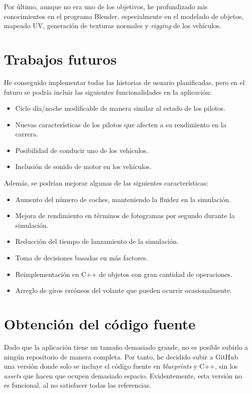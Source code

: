 \bigskip

Por último, aunque no era uno de los objetivos, he profundizado mis conocimientos en el programa Blender, especialmente en el modelado de objetos, mapeado UV, generación de texturas normales y \textit{rigging} de los vehículos.  


\section{Trabajos futuros}

He conseguido implementar todas las historias de usuario planificadas, pero en el futuro se podría incluir las siguientes funcionalidades en la aplicación:

\begin{itemize}
    \item Ciclo día/noche modificable de manera similar al estado de los pilotos.
    \item Nuevas características de los pilotos que afecten a su rendimiento en la carrera.
    \item Posibilidad de conducir uno de los vehículos.
    \item Inclusión de sonido de motor en los vehículos.
\end{itemize}

Además, se podrían mejorar algunas de las siguientes características:

\begin{itemize}
    \item Aumento del número de coches, manteniendo la fluidez en la simulación.
    \item Mejora de rendimiento en términos de fotogramas por segundo durante la simulación.
    \item Reducción del tiempo de lanzamiento de la simulación.
    \item Toma de decisiones basadas en más factores.
    \item Reimplementación en C++ de objetos con gran cantidad de operaciones.
    \item Arreglo de giros erróneos del volante que pueden ocurrir ocasionalmente.
\end{itemize}


\section{Obtención del código fuente}

Dado que la aplicación tiene un tamaño demasiado grande, no es posible subirlo a ningún repositorio de manera completa. Por tanto, he decidido subir a GitHub una versión donde solo se incluye el código fuente en \textit{blueprints} y C++, sin los \textit{assets} que hacen que ocupen demasiado espacio. Evidentemente, esta versión no es funcional, al no satisfacer todas las referencias.

